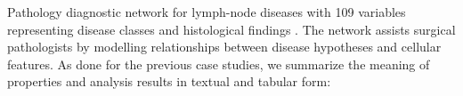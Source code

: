 Pathology diagnostic network for lymph-node diseases with 109 variables representing disease classes and histological findings \cite{heckerman1992pathfinder}. The network assists surgical pathologists by modelling relationships between disease hypotheses and cellular features. As done for the previous case studies, we summarize the meaning of properties and analysis results in textual and tabular form:
